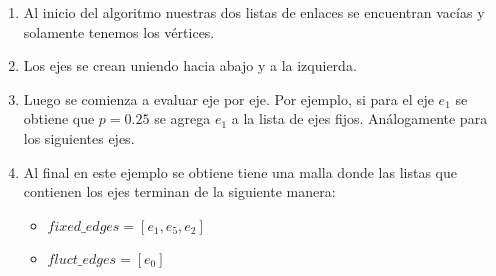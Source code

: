 \begin{enumerate}
	\item Al inicio del algoritmo nuestras dos listas de enlaces se encuentran vacías y solamente tenemos los vértices.
	\item Los ejes se crean uniendo hacia abajo y a la izquierda.
	\item Luego se comienza a evaluar eje por eje. Por ejemplo, si para el eje $e_1$ se obtiene que $p=0.25$ se agrega $e_1$ a la lista de ejes fijos. Análogamente para los siguientes ejes.
	\item Al final en este ejemplo se obtiene tiene una malla donde las listas que contienen los ejes terminan de la siguiente manera:
	\begin{itemize}
		\item $fixed\_edges=[e_1,e_5,e_2]$
		\item $fluct\_edges=[e_0]$
	\end{itemize}
\end{enumerate}


